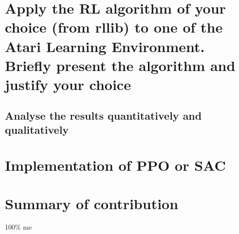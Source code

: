 \documentclass[a4pape, 11pt, english]{article} %
\begin{document}
\section{Apply the RL algorithm of your choice (from rllib) to one of the Atari Learning Environment. Briefly present the algorithm and justify your choice}

\subsection{Analyse the results quantitatively and qualitatively}

\section{Implementation of PPO or SAC}

\section{Summary of contribution}
100\% me


\end{document}

